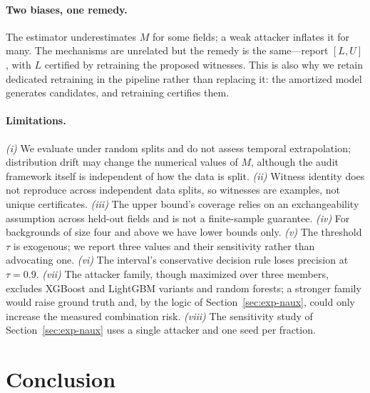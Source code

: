 \documentclass[preprint,12pt]{elsarticle}
\begin{document}
\paragraph{Two biases, one remedy.}
The estimator underestimates $M$ for some fields; a weak attacker inflates it for many.
The mechanisms are unrelated but the remedy is the same---report $[L,U]$, with $L$ certified
by retraining the proposed witnesses. This is also why we retain dedicated retraining in the
pipeline rather than replacing it: the amortized model generates candidates, and retraining
certifies them.

\paragraph{Limitations.}
\emph{(i)} We evaluate under random splits and do not assess temporal extrapolation;
distribution drift may change the numerical values of $M$, although the audit framework
itself is independent of how the data is split. \emph{(ii)} Witness identity does not
reproduce across independent data splits, so witnesses are examples, not unique certificates.
\emph{(iii)} The upper bound's coverage relies on an exchangeability assumption across
held-out fields and is not a finite-sample guarantee. \emph{(iv)} For backgrounds of size
four and above we have lower bounds only. \emph{(v)} The threshold $\tau$ is exogenous; we
report three values and their sensitivity rather than advocating one. \emph{(vi)} The
interval's conservative decision rule loses precision at $\tau=0.9$. \emph{(vii)} The
attacker family, though maximized over three members, excludes XGBoost and LightGBM variants
and random forests; a stronger family would raise ground truth and, by the logic of
Section~\ref{sec:exp-naux}, could only increase the measured combination risk.
\emph{(viii)} The sensitivity study of Section~\ref{sec:exp-naux} uses a single attacker and
one seed per fraction.

\section{Conclusion}\label{sec:conclusion}
\end{document}
